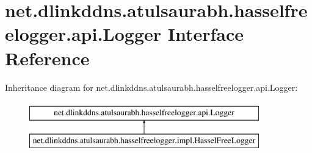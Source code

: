 \hypertarget{interfacenet_1_1dlinkddns_1_1atulsaurabh_1_1hasselfreelogger_1_1api_1_1_logger}{}\section{net.\+dlinkddns.\+atulsaurabh.\+hasselfreelogger.\+api.\+Logger Interface Reference}
\label{interfacenet_1_1dlinkddns_1_1atulsaurabh_1_1hasselfreelogger_1_1api_1_1_logger}
Inheritance diagram for net.\+dlinkddns.\+atulsaurabh.\+hasselfreelogger.\+api.\+Logger\+:\begin{figure}[H]
\begin{center}
\leavevmode
\includegraphics[height=2.000000cm]{d7/d4f/interfacenet_1_1dlinkddns_1_1atulsaurabh_1_1hasselfreelogger_1_1api_1_1_logger}
\end{center}
\end{figure}
